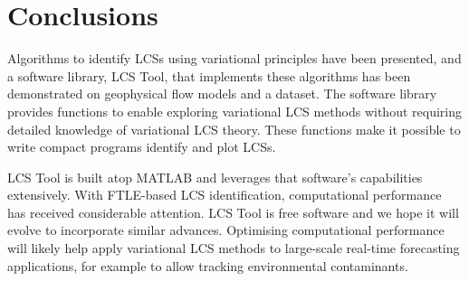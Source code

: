 \documentclass{article}
\begin{document}


\section{Conclusions}

Algorithms to identify LCSs using variational principles have been presented, and a software library, LCS Tool, that implements these algorithms has been demonstrated on geophysical flow models and a dataset. The software library provides functions to enable exploring variational LCS methods without requiring detailed knowledge of variational LCS theory. These functions make it possible to write compact programs identify and plot LCSs.

LCS Tool is built atop MATLAB\parencite{mathworks13:_matlab} and leverages that software's capabilities extensively. With FTLE-based LCS identification, computational performance has received considerable attention\parencite{conti12:_gpu_apu_finit_time_lyapun_expon,miron12:_anisot_lagran_coher_struc}. LCS Tool is free software and we hope it will evolve to incorporate similar advances. Optimising computational performance will likely help apply variational LCS methods to large-scale real-time forecasting applications, for example to allow tracking environmental contaminants.
\end{document}
